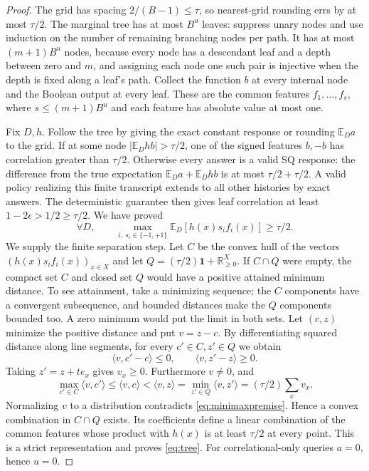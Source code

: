 \documentclass[11pt]{article}
\newcommand{\R}{\mathbb R}
\newcommand{\E}{\mathbb E}
\newcommand{\1}{\mathbf 1}
\begin{document}
\begin{proof}
The grid has spacing $2/(B-1)\leq\tau$, so nearest-grid rounding errs by at most $\tau/2$. The marginal tree has at most $B^u$ leaves: suppress unary nodes and use induction on the number of remaining branching nodes per path. It has at most $(m+1)B^u$ nodes, because every node has a descendant leaf and a depth between zero and $m$, and assigning each node one such pair is injective when the depth is fixed along a leaf's path.
Collect the function $b$ at every internal node and the Boolean output at every leaf. These are the common features $f_1,\ldots,f_s$, where $s\leq(m+1)B^u$ and each feature has absolute value at most one.

Fix $D,h$. Follow the tree by giving the exact constant response or rounding $\E_Da$ to the grid. If at some node $|\E_D hb|>\tau/2$, one of the signed features $b,-b$ has correlation greater than $\tau/2$. Otherwise every answer is a valid SQ response: the difference from the true expectation $\E_Da+\E_D hb$ is at most $\tau/2+\tau/2$. A valid policy realizing this finite transcript extends to all other histories by exact answers. The deterministic guarantee then gives leaf correlation at least $1-2\epsilon>1/2\geq\tau/2$. We have proved
\begin{equation}\label{eq:minimaxpremise}
 \forall D,\qquad \max_{i,\ s_i\in\{-1,+1\}}\E_D[h(x)s_if_i(x)]\geq\tau/2.
\end{equation}
We supply the finite separation step. Let $C$ be the convex hull of the vectors $(h(x)s_if_i(x))_{x\in X}$ and let $Q=(\tau/2)\1+\R_{\geq0}^X$. If $C\cap Q$ were empty, the compact set $C$ and closed set $Q$ would have a positive attained minimum distance. To see attainment, take a minimizing sequence; the $C$ components have a convergent subsequence, and bounded distances make the $Q$ components bounded too. A zero minimum would put the limit in both sets. Let $(c,z)$ minimize the positive distance and put $v=z-c$. By differentiating squared distance along line segments, for every $c'\in C,z'\in Q$ we obtain
\[
 \langle v,c'-c\rangle\leq0,\qquad
 \langle v,z'-z\rangle\geq0.
\]
Taking $z'=z+te_x$ gives $v_x\geq0$. Furthermore $v\ne0$, and
\[
 \max_{c'\in C}\langle v,c'\rangle
 \leq\langle v,c\rangle<\langle v,z\rangle
 =\min_{z'\in Q}\langle v,z'\rangle=(\tau/2)\sum_xv_x.
\]
Normalizing $v$ to a distribution contradicts \eqref{eq:minimaxpremise}. Hence a convex combination in $C\cap Q$ exists. Its coefficients define a linear combination of the common features whose product with $h(x)$ is at least $\tau/2$ at every point. This is a strict representation and proves \eqref{eq:tree}. For correlational-only queries $a=0$, hence $u=0$.


\end{proof}
\end{document}
